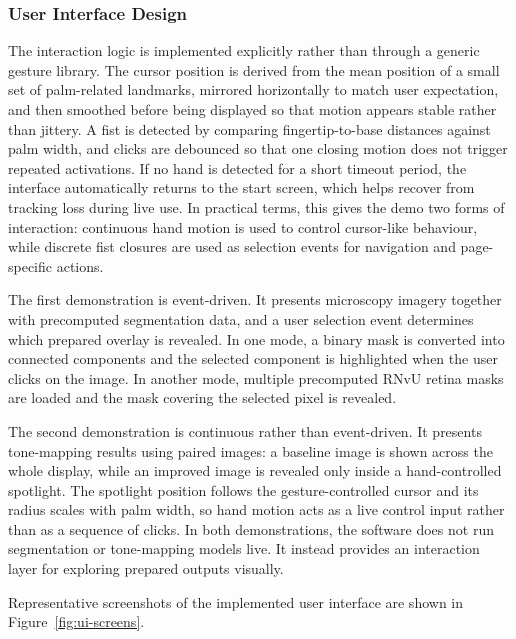﻿\documentclass[11pt,a4paper]{article}
\begin{document}
\subsubsection{User Interface Design}

The interaction logic is implemented explicitly rather than through a generic
gesture library. The cursor position is derived from the mean position of a
small set of palm-related landmarks, mirrored horizontally to match user
expectation, and then smoothed before being displayed so that motion appears
stable rather than jittery. A fist is detected by comparing
fingertip-to-base distances against palm width, and clicks are debounced so
that one closing motion does not trigger repeated activations. If no hand is
detected for a short timeout period, the interface automatically returns to
the start screen, which helps recover from tracking loss during live use. In
practical terms, this gives the demo two forms of interaction: continuous
hand motion is used to control cursor-like behaviour, while discrete fist
closures are used as selection events for navigation and page-specific
actions.

\medskip

\noindent
The first demonstration is event-driven. It presents microscopy imagery
together with precomputed segmentation data, and a user selection event
determines which prepared overlay is revealed. In one mode, a binary mask is
converted into connected components and the selected component is highlighted
when the user clicks on the image. In another mode, multiple precomputed RNvU
retina masks are loaded and the mask covering the selected pixel is revealed.

\medskip

\noindent
The second demonstration is continuous rather than event-driven. It presents
tone-mapping results using paired images: a baseline image is shown across the
whole display, while an improved image is revealed only inside a
hand-controlled spotlight. The spotlight position follows the
gesture-controlled cursor and its radius scales with palm width, so hand
motion acts as a live control input rather than as a sequence of clicks. In
both demonstrations, the software does not run segmentation or tone-mapping
models live. It instead provides an interaction layer for exploring prepared
outputs visually.

\medskip

\noindent
Representative screenshots of the implemented user interface are shown in
Figure~\ref{fig:ui-screens}.
\end{document}
